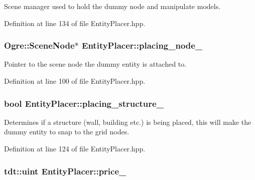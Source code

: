 Scene manager used to hold the dummy node and manipulate models. 



Definition at line 134 of file Entity\+Placer.\+hpp.

\subsubsection[{\texorpdfstring{placing\+\_\+node\+\_\+}{placing_node_}}]{\setlength{\rightskip}{0pt plus 5cm}Ogre\+::\+Scene\+Node$\ast$ Entity\+Placer\+::placing\+\_\+node\+\_\+\hspace{0.3cm}{\ttfamily [private]}}\hypertarget{class_entity_placer_a6e7d6a22bb82c701ef9a1be971de9205}{}\label{class_entity_placer_a6e7d6a22bb82c701ef9a1be971de9205}


Pointer to the scene node the dummy entity is attached to. 



Definition at line 100 of file Entity\+Placer.\+hpp.

\subsubsection[{\texorpdfstring{placing\+\_\+structure\+\_\+}{placing_structure_}}]{\setlength{\rightskip}{0pt plus 5cm}bool Entity\+Placer\+::placing\+\_\+structure\+\_\+\hspace{0.3cm}{\ttfamily [private]}}\hypertarget{class_entity_placer_af3edb9c35afa51723737c9995bdd2f84}{}\label{class_entity_placer_af3edb9c35afa51723737c9995bdd2f84}


Determines if a structure (wall, building etc.) is being placed, this will make the dummy entity to snap to the grid nodes. 



Definition at line 124 of file Entity\+Placer.\+hpp.

\subsubsection[{\texorpdfstring{price\+\_\+}{price_}}]{\setlength{\rightskip}{0pt plus 5cm}tdt\+::uint Entity\+Placer\+::price\+\_\+\hspace{0.3cm}{\ttfamily [private]}}\hypertarget{class_entity_placer_a936cda73ed84004f4c7b339481c6124b}{}\label{class_entity_placer_a936cda73ed84004f4c7b339481c6124b}


